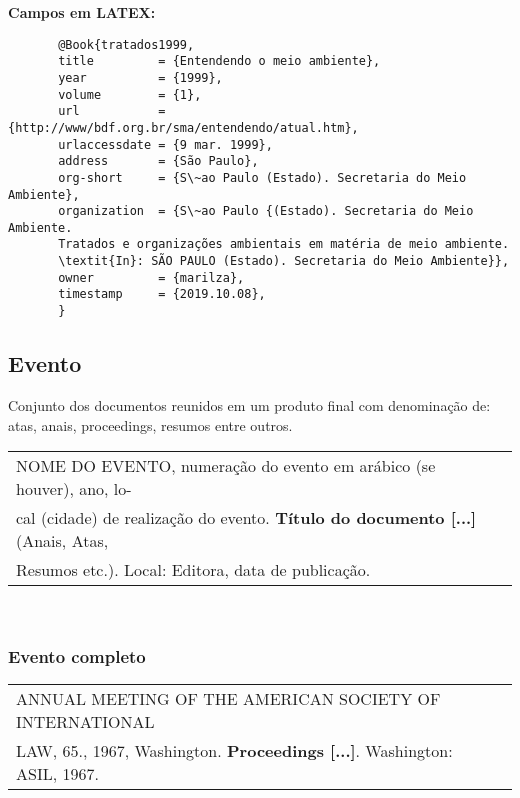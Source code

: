 	  \textbf{Campos em LATEX:} 

	  \begin{verbatim}
	   @Book{tratados1999,
	   title         = {Entendendo o meio ambiente},
	   year          = {1999},
	   volume        = {1},
	   url           = {http://www/bdf.org.br/sma/entendendo/atual.htm},
	   urlaccessdate = {9 mar. 1999},
	   address       = {São Paulo},
	   org-short     = {S\~ao Paulo (Estado). Secretaria do Meio Ambiente},
	   organization  = {S\~ao Paulo {(Estado). Secretaria do Meio Ambiente. 
	   Tratados e organizações ambientais em matéria de meio ambiente. 
	   \textit{In}: SÃO PAULO (Estado). Secretaria do Meio Ambiente}},
	   owner         = {marilza},
	   timestamp     = {2019.10.08},
	   }
	 \end{verbatim}
	 
	

\subsection{Evento}

Conjunto dos documentos reunidos em um produto final com denominação
de: atas, anais, proceedings, resumos entre outros. \\

\begin{tabular}{|l|c|} \hline
	
	NOME DO EVENTO, numeração do evento em arábico (se
	houver), ano, lo-\\cal (cidade) de realização do evento. \textbf{Título do documento [...]} (Anais, Atas, \\Resumos etc.). Local: Editora, data de publicação. \\\hline
\end{tabular} \\ 

\subsubsection{Evento completo} 

\begin{tabular}{|l|c|} \hline
	ANNUAL MEETING OF THE AMERICAN SOCIETY OF INTERNATIONAL \\ LAW, 65., 1967,  Washington. \textbf{Proceedings [...]}. Washington: ASIL, 1967. \\\hline
\end{tabular} \\

